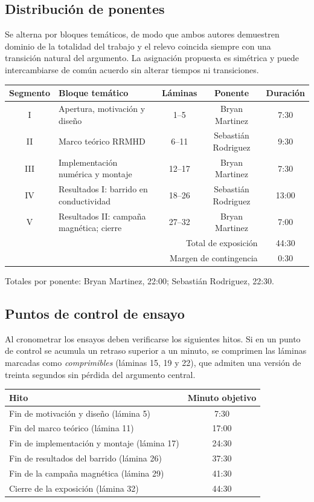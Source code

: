 \documentclass[11pt,letterpaper]{article}
\begin{document}
\subsection{Distribución de ponentes}
Se alterna por bloques temáticos, de modo que ambos autores demuestren dominio
de la totalidad del trabajo y el relevo coincida siempre con una transición
natural del argumento. La asignación propuesta es simétrica y puede
intercambiarse de común acuerdo sin alterar tiempos ni transiciones.

\begin{center}
\begin{tabular}{@{}clccc@{}}
\toprule
Segmento & Bloque temático & Láminas & Ponente & Duración\\
\midrule
I   & Apertura, motivación y diseño          & 1--5   & Bryan Martinez & 7:30\\
II  & Marco teórico RRMHD                    & 6--11  & Sebastián Rodriguez      & 9:30\\
III & Implementación numérica y montaje      & 12--17 & Bryan Martinez & 7:30\\
IV  & Resultados I: barrido en conductividad & 18--26 & Sebastián Rodriguez      & 13:00\\
V   & Resultados II: campaña magnética; cierre & 27--32 & Bryan Martinez & 7:00\\
\midrule
\multicolumn{4}{r}{Total de exposición} & 44:30\\
\multicolumn{4}{r}{Margen de contingencia} & 0:30\\
\bottomrule
\end{tabular}
\end{center}

Totales por ponente: Bryan Martinez, 22:00; Sebastián Rodriguez, 22:30.

\subsection{Puntos de control de ensayo}
Al cronometrar los ensayos deben verificarse los siguientes hitos. Si en un
punto de control se acumula un retraso superior a un minuto, se comprimen las
láminas marcadas como \emph{comprimibles} (láminas 15, 19 y 22), que admiten
una versión de treinta segundos sin pérdida del argumento central.

\begin{center}
\begin{tabular}{@{}lc@{}}
\toprule
Hito & Minuto objetivo\\
\midrule
Fin de motivación y diseño (lámina 5)            & 7:30\\
Fin del marco teórico (lámina 11)                & 17:00\\
Fin de implementación y montaje (lámina 17)      & 24:30\\
Fin de resultados del barrido (lámina 26)        & 37:30\\
Fin de la campaña magnética (lámina 29)          & 41:30\\
Cierre de la exposición (lámina 32)              & 44:30\\
\bottomrule
\end{tabular}
\end{center}
\end{document}
